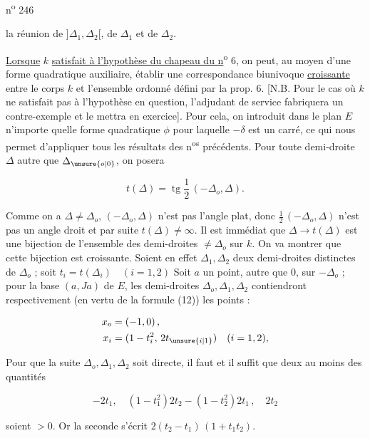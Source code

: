 n\textsuperscript{o} 246

la réunion de $]\Delta_1,\Delta_2[$, de $\Delta_1$ et de $\Delta_2$.

\uline{Lorsque} $k$ \uline{satisfait à l'hypothèse du chapeau du n}\textsuperscript{o} 6, on peut, au moyen d'une forme quadratique auxiliaire, établir une correspondance biunivoque \uline{croissante} entre le corps $k$ et l'ensemble ordonné défini par la prop. 6. [N.B. Pour le cas où $k$ ne satisfait pas à l'hypothèse en question, l'adjudant de service fabriquera un contre-exemple et le mettra en exercice]. Pour cela, on introduit dans le plan $E$ n'importe quelle forme quadratique $\phi$ pour laquelle $-\delta$ est un carré, ce qui nous permet d'appliquer tous les résultats des n\textsuperscript{os} précédents. Pour toute demi-droite $\Delta$ autre que $\Delta_{\unsure{o|0}}$, on posera

\[
t(\Delta)=\operatorname{tg}\frac{1}{2}\,(-\Delta_o,\Delta).
\]

Comme on a $\Delta\ne\Delta_o$, $(-\Delta_o,\Delta)$ n'est pas l'angle plat, donc $\frac{1}{2}\,(-\Delta_o,\Delta)$ n'est pas un angle droit et par suite $t(\Delta)\ne\infty$. Il est immédiat que $\Delta\longrightarrow t(\Delta)$ est une bijection de l'ensemble des demi-droites $\ne\Delta_o$ sur $k$. On va montrer que cette bijection est croissante. Soient en effet $\Delta_1,\Delta_2$ deux demi-droites distinctes de $\Delta_o$ ; soit $t_i=t(\Delta_i)\quad(i=1,2)$ Soit $a$ un point, autre que $0$, sur $-\Delta_o$ ; pour la base $(a,Ja)$ de $E$, les demi-droites $\Delta_o,\Delta_1,\Delta_2$ contiendront respectivement (en vertu de la formule (12)) les points :

\[
\begin{aligned}
x_o&=(-1,0)\,,\\
x_i&=(1-t_i^2,\,2t_{\unsure{i|1}})\quad(i=1,2),
\end{aligned}
\]

Pour que la suite $\Delta_o,\Delta_1,\Delta_2$ soit directe, il faut et il suffit que deux au moins des quantités

\[
-2t_1,\quad(1-t_1^2)2t_2-(1-t_2^2)2t_1\,,\quad 2t_2
\]

soient $>0$. Or la seconde s'écrit $2(t_2-t_1)\,(1+t_1t_2)$.
